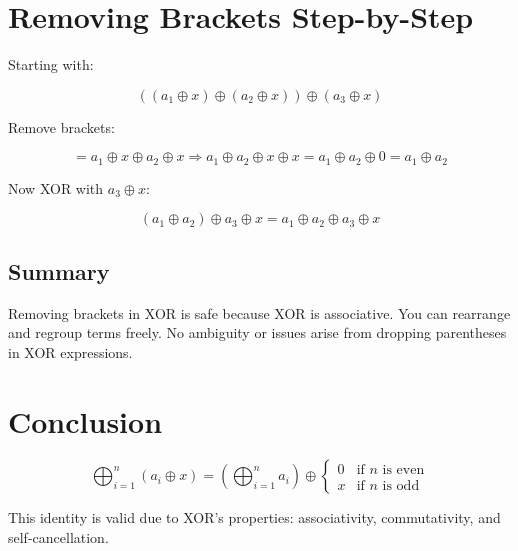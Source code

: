 \documentclass{article}
\begin{document}
\section*{Removing Brackets Step-by-Step}

Starting with:

\[
((a_1 \oplus x) \oplus (a_2 \oplus x)) \oplus (a_3 \oplus x)
\]

Remove brackets:

\[
= a_1 \oplus x \oplus a_2 \oplus x
\Rightarrow a_1 \oplus a_2 \oplus x \oplus x
= a_1 \oplus a_2 \oplus 0 = a_1 \oplus a_2
\]

Now XOR with \( a_3 \oplus x \):

\[
(a_1 \oplus a_2) \oplus a_3 \oplus x = a_1 \oplus a_2 \oplus a_3 \oplus x
\]

\subsection*{Summary}

Removing brackets in XOR is safe because XOR is associative.  
You can rearrange and regroup terms freely.  
No ambiguity or issues arise from dropping parentheses in XOR expressions.

\section*{Conclusion}

\[
\bigoplus_{i=1}^{n}(a_i \oplus x) =
\left(\bigoplus_{i=1}^{n} a_i \right) \oplus 
\begin{cases}
0 & \text{if } n \text{ is even} \\
x & \text{if } n \text{ is odd}
\end{cases}
\]

This identity is valid due to XOR’s properties: associativity, commutativity, and self-cancellation.
\end{document}
